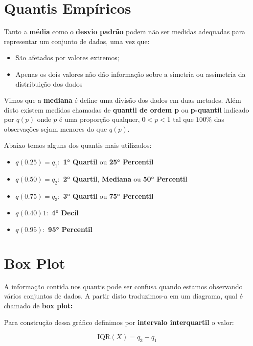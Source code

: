 \documentclass[
]{book}
\begin{document}
\hypertarget{quantis-empuxedricos}{%
\section{Quantis Empíricos}\label{quantis-empuxedricos}}

Tanto a \textbf{média} como o \textbf{desvio padrão} podem não ser medidas adequadas para representar um conjunto de dados, uma vez que:

\begin{itemize}
\item
  São afetados por valores extremos;
\item
  Apenas os dois valores não dão informação sobre a simetria ou assimetria da distribuição dos dados
\end{itemize}

Vimos que a \textbf{mediana} é define uma divisão dos dados em duas metades. Além disto existem medidas chamadas de \textbf{quantil de ordem p} ou \textbf{p-quantil} indicado por \(q(p)\) onde \(p\) é uma proporção qualquer, \(0<p<1\) tal que \(100\%\) das observações sejam menores do que \(q(p)\).

Abaixo temos alguns dos quantis mais utilizados:

\begin{itemize}
\item
  \(q(0.25) = q_1:\) \textbf{1° Quartil} ou \textbf{25° Percentil}
\item
  \(q(0.50) = q_2:\) \textbf{2° Quartil}, \textbf{Mediana} ou \textbf{50° Percentil}
\item
  \(q(0.75) = q_3:\) \textbf{3° Quartil} ou \textbf{75° Percentil}
\item
  \(q(0.40) 1:\) \textbf{4° Decil}
\item
  \(q(0.95):\) \textbf{95° Percentil}
\end{itemize}

\hypertarget{box-plot}{%
\section{Box Plot}\label{box-plot}}

A informação contida nos quantis pode ser confusa quando estamos observando vários conjuntos de dados. A partir disto traduzimos-a em um diagrama, qual é chamado de \textbf{box plot:}

Para construção dessa gráfico definimos por \textbf{intervalo interquartil} o valor:

\[
\text{IQR}(X) = q_3 - q_1
\]
\end{document}
